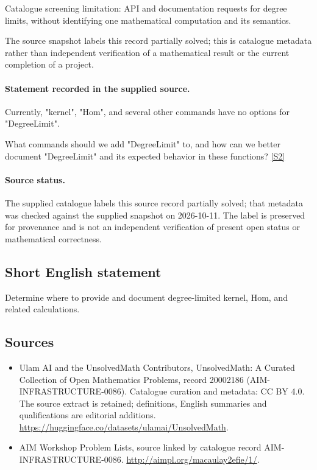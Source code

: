 \documentclass[11pt]{article}
\begin{document}
Catalogue screening limitation: API and documentation requests for degree limits, without identifying one mathematical computation and its semantics.

The source snapshot labels this record partially solved; this is catalogue metadata rather than independent verification of a mathematical result or the current completion of a project.
\paragraph{Statement recorded in the supplied source.}
Currently, "kernel", "Hom", and several other commands have no options for "DegreeLimit".

What commands should we add "DegreeLimit" to, and how can we better document "DegreeLimit" and its expected behavior in these functions? \href{http://aimpl.org/macaulay2efie/1/}{[S2]}
\paragraph{Source status.}
The supplied catalogue labels this source record partially solved; that metadata was checked against the supplied snapshot on 2026-10-11. The label is preserved for provenance and is not an independent verification of present open status or mathematical correctness.
\subsection{Short English statement}
Determine where to provide and document degree-limited kernel, Hom, and related calculations.
\subsection{Sources}
\begin{itemize}
\item[S1] Ulam AI and the UnsolvedMath Contributors, UnsolvedMath: A Curated Collection of Open Mathematics Problems, record 20002186 (AIM-INFRASTRUCTURE-0086). Catalogue curation and metadata: CC BY 4.0. The source extract is retained; definitions, English summaries and qualifications are editorial additions.
\url{https://huggingface.co/datasets/ulamai/UnsolvedMath}.
\item[S2] AIM Workshop Problem Lists, source linked by catalogue record AIM-INFRASTRUCTURE-0086.
\url{http://aimpl.org/macaulay2efie/1/}.
\end{itemize}
\end{document}
